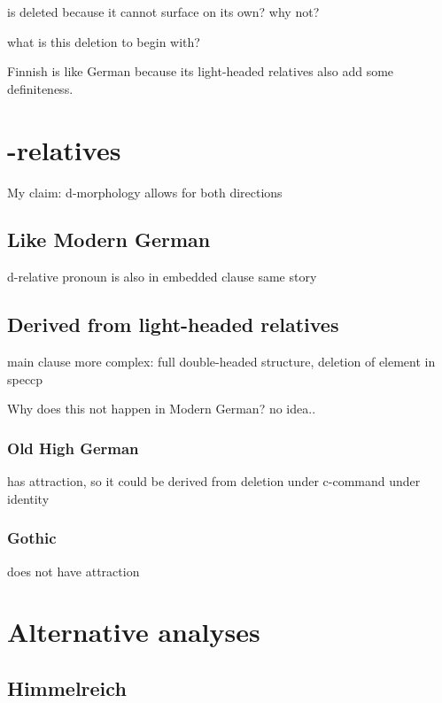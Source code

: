  is deleted because it cannot surface on its own? why not?

what is this deletion to begin with?

Finnish is like German because its light-headed relatives also add some definiteness.




\section{-relatives}

My claim: d-morphology allows for both directions

\subsection{Like Modern German}

d-relative pronoun is also in embedded clause
same story

\subsection{Derived from light-headed relatives}

main clause more complex: full double-headed structure, deletion of element in speccp

Why does this not happen in Modern German? no idea..

\subsubsection{Old High German}

has attraction, so it could be derived from deletion under c-command under identity

\subsubsection{Gothic}

does not have attraction








\section{Alternative analyses}

\subsection{Himmelreich}



